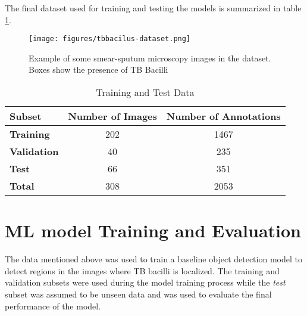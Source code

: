 \documentclass[../main.tex]{subfiles}
\begin{document}
    The final dataset used for training and testing the models is summarized in table \ref{tab:training-test-data}.

 
    \begin{figure}[ht]
     \centering
     \texttt{[image: figures/tbbacilus-dataset.png]}
     \caption{Example of some smear-sputum microscopy images in the dataset. Boxes show the presence of TB Bacilli }
     \label{fig:tbbacillus_image_examples}
 \end{figure}

 
 \begin{table}[h]
    \centering
    \caption{Training and Test Data}
    \label{tab:training-test-data}
    \begin{tabular}{l|c|c}
        \toprule
        \textbf{Subset} & \textbf{Number of Images} & \textbf{Number of Annotations} \\
        \midrule
        \textbf{Training} & 202 & 1467 \\
        \textbf{Validation} & 40 & 235 \\
        \textbf{Test} & 66 & 351 \\
        \midrule
        \textbf{Total} & 308 & 2053 \\
        \bottomrule
    \end{tabular}
\end{table}

\vspace{-0.6cm}
 \section{ML model Training and Evaluation}
\vspace{-0.4cm}

 The data mentioned above was used to train a baseline object detection model to detect regions in the images where TB bacilli is localized. The training and validation subsets were used during the model training process while the \textit{test} subset was assumed to be unseen data and was used to evaluate the final performance of the model.
\end{document}
